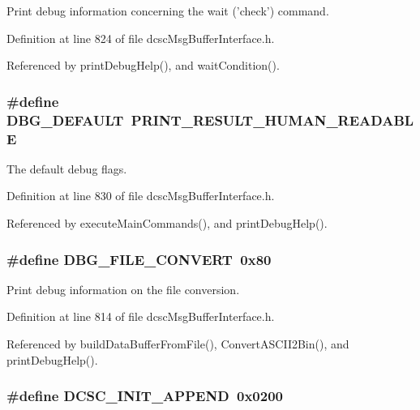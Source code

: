 Print debug information concerning the wait ('check') command. 



Definition at line 824 of file dcsc\-Msg\-Buffer\-Interface.h.

Referenced by print\-Debug\-Help(), and wait\-Condition().\hypertarget{group__dcsc__msg__buffer__access_gf34c3c30400c83a97dd0deadaead479c}{
\subsubsection[DBG\_\-DEFAULT]{\setlength{\rightskip}{0pt plus 5cm}\#define DBG\_\-DEFAULT~PRINT\_\-RESULT\_\-HUMAN\_\-READABLE}}
\label{group__dcsc__msg__buffer__access_gf34c3c30400c83a97dd0deadaead479c}


The default debug flags. 



Definition at line 830 of file dcsc\-Msg\-Buffer\-Interface.h.

Referenced by execute\-Main\-Commands(), and print\-Debug\-Help().\hypertarget{group__dcsc__msg__buffer__access_g6fe994d64da543fe875682bb79b5d585}{
\subsubsection[DBG\_\-FILE\_\-CONVERT]{\setlength{\rightskip}{0pt plus 5cm}\#define DBG\_\-FILE\_\-CONVERT~0x80}}
\label{group__dcsc__msg__buffer__access_g6fe994d64da543fe875682bb79b5d585}


Print debug information on the file conversion. 



Definition at line 814 of file dcsc\-Msg\-Buffer\-Interface.h.

Referenced by build\-Data\-Buffer\-From\-File(), Convert\-ASCII2Bin(), and print\-Debug\-Help().\hypertarget{group__dcsc__msg__buffer__access_g1bf79fbd2d8c4bcfbed37007a5e9d4b0}{
\subsubsection[DCSC\_\-INIT\_\-APPEND]{\setlength{\rightskip}{0pt plus 5cm}\#define DCSC\_\-INIT\_\-APPEND~0x0200}}
\label{group__dcsc__msg__buffer__access_g1bf79fbd2d8c4bcfbed37007a5e9d4b0}


